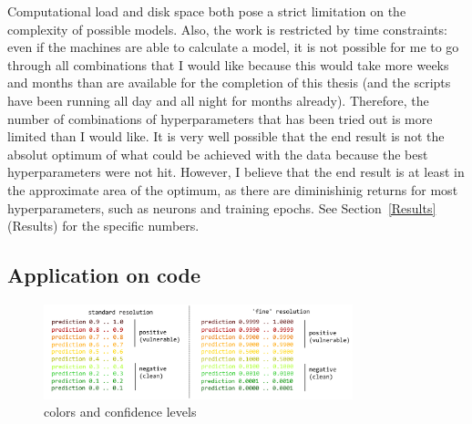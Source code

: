 \documentclass[
a4paper,
pagesize,
pdftex,
12pt,
twoside, %
BCOR=5mm, %
ngerman,
fleqn,
final,
]{scrartcl}
\begin{document}
	Computational load and disk space both pose a strict limitation on the complexity of possible models. Also, the work is restricted by time constraints: even if the machines are able to calculate a model, it is not possible for me to go through all combinations that I would like because this would take more weeks and months than are available for the completion of this thesis (and the scripts have been running all day and all night for months already). Therefore, the number of combinations of hyperparameters that has been tried out is more limited than I would like. It is very well possible that the end result is not the absolut optimum of what could be achieved with the data because the best hyperparameters were not hit. However, I believe that the end result is at least in the approximate area of the optimum, as there are diminishinig returns for most hyperparameters, such as neurons and training epochs. See Section~\ref{Results} (Results) for the specific numbers. 
		
	\subsection{Application on code}
	\begin{figure}[h]
		\centering
		\includegraphics[width=0.8\textwidth]{img/colorkey.png}
		\caption{colors and confidence levels}
		\label{fig:colors}
	\end{figure}
	
\end{document}
